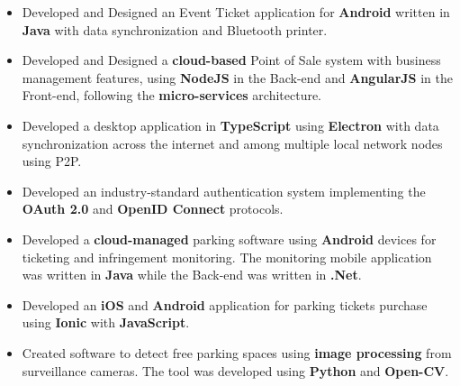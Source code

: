\documentclass[10pt,a4paper,ragged2e]{altacv}
\begin{document}
\divider%

\clearpage
{}

\begin{itemize}
	\item Developed and Designed an Event Ticket application for \textbf{Android} written in \textbf{Java} with data synchronization and Bluetooth printer.
\item Developed and Designed a \textbf{cloud-based} Point of Sale system with business management features, using \textbf{NodeJS} in the Back-end and \textbf{AngularJS} in the Front-end, following the \textbf{micro-services} architecture.
\item Developed a desktop application in \textbf{TypeScript} using \textbf{Electron} with data synchronization across the internet and among multiple local network nodes using P2P.
\item Developed an industry-standard authentication system implementing the \textbf{OAuth 2.0} and \textbf{OpenID Connect} protocols.
\end{itemize}

\divider%

\begin{itemize}
	\item Developed a \textbf{cloud-managed} parking software using \textbf{Android} devices for ticketing and infringement monitoring. The monitoring mobile application was written in \textbf{Java} while the Back-end was written in \textbf{.Net}.
	\item Developed an \textbf{iOS} and \textbf{Android} application for parking tickets purchase using \textbf{Ionic} with \textbf{JavaScript}.
\item Created software to detect free parking spaces using \textbf{image processing} from surveillance cameras. The tool was developed using \textbf{Python} and \textbf{Open-CV}\@.
\end{itemize}


\divider%

\end{document}
